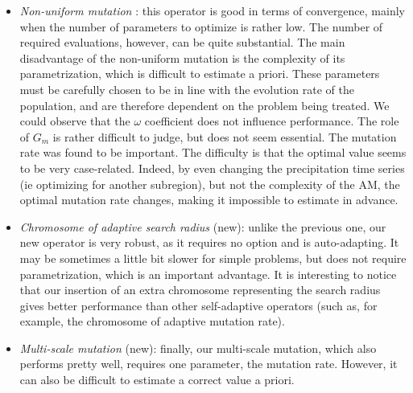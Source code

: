 \documentclass[twocol]{ametsoc}
\begin{document}
\begin{itemize}

	\item \textit{Non-uniform mutation} \citep{Michalewicz1996}: this operator is good in terms of convergence, mainly when the number of parameters to optimize is rather low. The number of required evaluations, however, can be quite substantial. The main disadvantage of the non-uniform mutation is the complexity of its parametrization, which is difficult to estimate a priori. These parameters must be carefully chosen to be in line with the evolution rate of the population, and are therefore dependent on the problem being treated. We could observe that the $\omega$ coefficient does not influence performance. The role of $G_{m}$ is rather difficult to judge, but does not seem essential. The mutation rate was found to be important. The difficulty is that the optimal value seems to be very case-related. Indeed, by even changing the precipitation time series (ie optimizing for another subregion), but not the complexity of the AM, the optimal mutation rate changes, making it impossible to estimate in advance.
	
	\item \textit{Chromosome of adaptive search radius} (new): unlike the previous one, our new operator is very robust, as it requires no option and is auto-adapting. It may be sometimes a little bit slower for simple problems, but does not require parametrization, which is an important advantage. It is interesting to notice that our insertion of an extra chromosome representing the search radius gives better performance than other self-adaptive operators (such as, for example, the chromosome of adaptive mutation rate).
	
	\item \textit{Multi-scale mutation} (new): finally, our multi-scale mutation, which also performs pretty well, requires one parameter, the mutation rate. However, it can also be difficult to estimate a correct value a priori.

\end{itemize}
\end{document}
